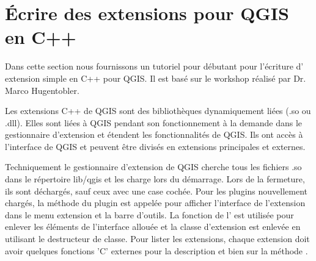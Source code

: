 
\section{\'Ecrire des extensions pour QGIS en C++}\label{cpp_plugin}


Dans cette section nous fournissons un tutoriel pour d\'ebutant pour l'\'ecriture d'
extension simple en C++ pour QGIS. Il est bas\'e sur le workshop r\'ealis\'e par Dr. 
Marco Hugentobler.

Les extensions C++ de QGIS sont des biblioth\`eques dynamiquement li\'ees (.so ou .dll). 
Elles sont li\'ees \`a QGIS pendant son fonctionnement \`a la demande dans le 
gestionnaire d'extension et \'etendent les fonctionnalit\'es de QGIS. Ils ont acc\`es \`a 
l'interface de QGIS et peuvent \^etre divis\'es en extensions principales et externes.

Techniquement le gestionnaire d'extension de QGIS cherche tous les fichiers .so 
dans le r\'epertoire lib/qgis et les charge lors du  d\'emarrage. Lors de la 
fermeture, ils sont d\'echarg\'es, sauf ceux avec une case coch\'ee. Pour les plugins 
nouvellement charg\'es, la m\'ethode  du plugin est appel\'ee 
pour afficher l'interface de l'extension dans le menu extension et la barre d'outils. 
La fonction  de l' est utilis\'ee pour enlever les \'el\'ements 
de l'interface allou\'ee et la classe d'extension est enlev\'ee en utilisant le 
destructeur de classe. Pour lister les extensions, chaque extension doit avoir 
quelques fonctions 'C' externes pour la description et bien sur la m\'ethode 
.

